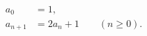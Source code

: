 \documentclass{article}
\begin{document}
\begin{equation}\label{eq:recurrence}
\begin{aligned}
  a_0&=1,\\
  a_{n+1}&=2a_n+1 \qquad (n\ge0).
\end{aligned}
\end{equation}
\end{document}
